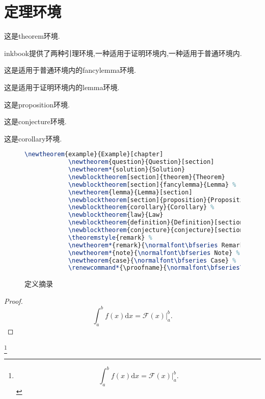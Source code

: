 \documentclass[cn]{inkbook}
\newcommand\showfn\relax
\newcommand{\mathd}{\mathrm{d}}
\renewcommand{\bfseries}{\heiti}
\begin{document}
    \section{定理环境}
    \begin{theorem}
        这是\textsf{theorem}环境.
    \end{theorem}
    \textsf{inkbook}提供了两种引理环境,一种适用于证明环境内,一种适用于普通环境内.
    \begin{fancylemma}
        这是适用于普通环境内的\textsf{fancylemma}环境.
    \end{fancylemma}
    \begin{lemma}
        这是适用于证明环境内的\textsf{lemma}环境.
    \end{lemma}
    \begin{proposition}
        这是\textsf{proposition}环境.
    \end{proposition}
    \begin{conjecture}
        这是\textsf{conjecture}环境.
    \end{conjecture}
    \begin{corollary}
        这是\textsf{corollary}环境.
    \end{corollary}
    \begin{figure}
        \begin{lstlisting}[language=TeX]
            \newtheorem{example}{Example}[chapter]
            \newtheorem{question}{Question}[section]
            \newtheorem*{solution}{Solution}
            \newblocktheorem[section]{theorem}{Theorem}
            \newblocktheorem[section]{fancylemma}{Lemma} %
            \newtheorem{lemma}{Lemma}[section]
            \newblocktheorem[section]{proposition}{Proposition} %
            \newblocktheorem{corollary}{Corollary} %
            \newblocktheorem{law}{Law}
            \newblocktheorem{definition}{Definition}[section] %
            \newblocktheorem{conjecture}{conjecture}[section] %
            \theoremstyle{remark} %
            \newtheorem*{remark}{\normalfont\bfseries Remark} %
            \newtheorem*{note}{\normalfont\bfseries Note} %
            \newtheorem{case}{\normalfont\bfseries Case} %
            \renewcommand*{\proofname}{\normalfont\bfseries\color{black}Proof} %
        \end{lstlisting}
        \caption{定义摘录}
    \end{figure}

    \begin{proof}
        \begin{equation}
        \int_a^b f(x)\mathd x =\mathcal{F}(x)\Big|_a^b. 
    \end{equation}
    \end{proof}
    \footnote{\[
        \int_a^b f(x)\mathd x =\mathcal{F}(x)\Big|_a^b. 
    \]}
    \showfn
\end{document}
